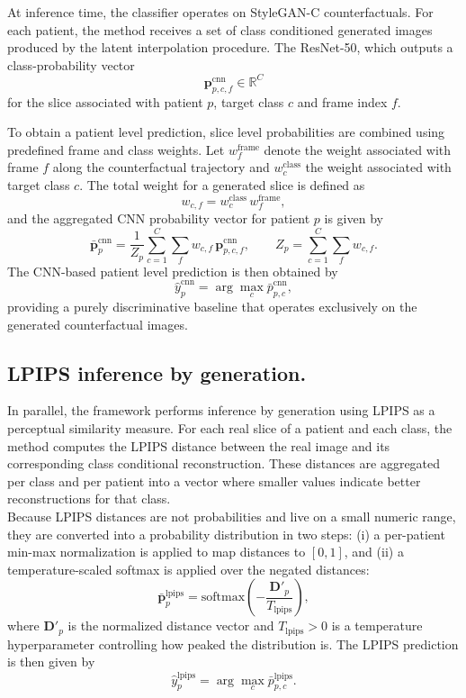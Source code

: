 At inference time, the classifier operates on StyleGAN-C counterfactuals. For each patient, the method receives a set of class conditioned generated images produced by the latent interpolation procedure. The ResNet-50, which outputs a class-probability vector
\[
\mathbf{p}^{\text{cnn}}_{p,c,f} \in \mathbb{R}^C
\]
for the slice associated with patient $p$, target class $c$ and frame index $f$.

To obtain a patient level prediction, slice level probabilities are combined using predefined frame and class weights. Let $w^{\text{frame}}_f$ denote the weight associated with frame $f$ along the counterfactual trajectory and $w^{\text{class}}_c$ the weight associated with target class $c$. The total weight for a generated slice is defined as
\[
w_{c,f} = w^{\text{class}}_c \, w^{\text{frame}}_f,
\]
and the aggregated CNN probability vector for patient $p$ is given by
\[
\bar{\mathbf{p}}^{\text{cnn}}_p
=
\frac{1}{Z_p}
\sum_{c=1}^{C}
\sum_{f} w_{c,f} \, \mathbf{p}^{\text{cnn}}_{p,c,f},
\qquad
Z_p = \sum_{c=1}^{C} \sum_{f} w_{c,f}.
\]
The CNN-based patient level prediction is then obtained by
\[
\hat{y}^{\text{cnn}}_p = \arg\max_{c} \bar{p}^{\text{cnn}}_{p,c},
\]
providing a purely discriminative baseline that operates exclusively on the generated counterfactual images.




\subsection{LPIPS inference by generation.}

In parallel, the framework performs inference by generation using LPIPS as a perceptual similarity measure. For each real slice of a patient and each class, the method computes the LPIPS distance between the real image and its corresponding class conditional reconstruction. These distances are aggregated per class and per patient into a vector where smaller values indicate better reconstructions for that class.\\

Because LPIPS distances are not probabilities and live on a small numeric range, they are converted into a probability distribution in two steps: (i) a per-patient min-max normalization is applied to map distances to $[0,1]$, and (ii) a temperature-scaled softmax is applied over the negated distances:
\[
\bar{\mathbf{p}}^{\text{lpips}}_p
=
\text{softmax}\!\left(- \frac{\mathbf{D}'_p}{T_{\text{lpips}}}\right),
\]
where $\mathbf{D}'_p$ is the normalized distance vector and $T_{\text{lpips}}>0$ is a temperature hyperparameter controlling how peaked the distribution is. The LPIPS prediction is then given by
\[
\hat{y}^{\text{lpips}}_p = \arg\max_{c} \bar{p}^{\text{lpips}}_{p,c}.
\]

